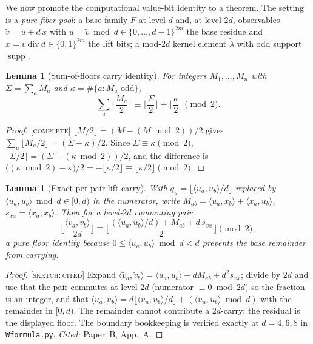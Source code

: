 \documentclass[11pt]{article}
\newtheorem{lemma}[theorem]{Lemma}
\theoremstyle{definition}
\theoremstyle{remark}
\newcommand{\ip}[2]{\langle #1,#2\rangle}
\DeclareMathOperator{\supp}{supp}
\newcommand{\CO}{\textnormal{\textsc{[complete]}}}
\newcommand{\SK}{\textnormal{\textsc{[sketch:\,cited]}}}
\begin{document}
We now promote the computational value-bit identity to a theorem. The setting is a \emph{pure fiber
pool}: a base family $F$ at level $d$ and, at level $2d$, observables $\tilde v=u+d\,x$ with
$u=\tilde v\bmod d\in\{0,\dots,d-1\}^{2m}$ the base residue and $x=\tilde v\ \mathrm{div}\ d\in
\{0,1\}^{2m}$ the lift bits; a mod-$2d$ kernel element $\tilde\lambda$ with odd support $\supp$.

\begin{lemma}[Sum-of-floors carry identity]\label{lem:floors}
For integers $M_1,\dots,M_n$ with $\Sigma=\sum_aM_a$ and $\kappa=\#\{a:M_a\text{ odd}\}$,
\[
\sum_a\Big\lfloor\frac{M_a}{2}\Big\rfloor\equiv\Big\lfloor\frac\Sigma2\Big\rfloor+
\Big\lfloor\frac\kappa2\Big\rfloor\pmod2 .
\]
\end{lemma}
\begin{proof}
\CO{} $\lfloor M/2\rfloor=(M-(M\bmod2))/2$ gives $\sum_a\lfloor M_a/2\rfloor=(\Sigma-\kappa)/2$.
Since $\Sigma\equiv\kappa\pmod2$, $\lfloor\Sigma/2\rfloor=(\Sigma-(\kappa\bmod2))/2$, and the
difference is $\bigl((\kappa\bmod2)-\kappa\bigr)/2=-\lfloor\kappa/2\rfloor\equiv\lfloor\kappa/2\rfloor
\pmod2$.
\end{proof}

\begin{lemma}[Exact per-pair lift carry]\label{lem:pairfloor}
With $q_u=\lfloor\ip{u_a}{u_b}/d\rfloor$ replaced by $\ip{u_a}{u_b}\bmod d\in[0,d)$ in the numerator,
write $M_{ab}=\ip{u_a}{x_b}+\ip{x_a}{u_b}$, $s_{xx}=\ip{x_a}{x_b}$. Then for a level-$2d$ commuting
pair,
\[
\Big\lfloor\frac{\ip{\tilde v_a}{\tilde v_b}}{2d}\Big\rfloor\equiv
\Big\lfloor\frac{(\ip{u_a}{u_b}/d)+M_{ab}+d\,s_{xx}}{2}\Big\rfloor\pmod2 ,
\]
a pure floor identity because $0\le\ip{u_a}{u_b}\bmod d<d$ prevents the base remainder from carrying.
\end{lemma}
\begin{proof}
\SK{} Expand $\ip{\tilde v_a}{\tilde v_b}=\ip{u_a}{u_b}+dM_{ab}+d^2s_{xx}$; divide by $2d$ and use
that the pair commutes at level $2d$ (numerator $\equiv0\bmod 2d$) so the fraction is an integer, and
that $\ip{u_a}{u_b}=d\lfloor\ip{u_a}{u_b}/d\rfloor+(\ip{u_a}{u_b}\bmod d)$ with the remainder in
$[0,d)$. The remainder cannot contribute a $2d$-carry; the residual is the displayed floor. The
boundary bookkeeping is verified exactly at $d=4,6,8$ in \texttt{Wformula.py}. \emph{Cited:}
Paper~B, App.~A.
\end{proof}
\end{document}
